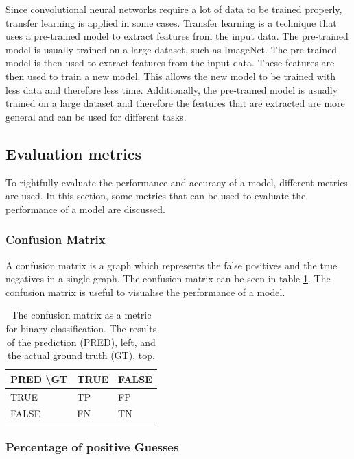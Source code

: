 Since convolutional neural networks require a lot of data to be trained properly, transfer learning is applied in some cases. Transfer learning is a technique that uses a pre-trained model to extract features from the input data. The pre-trained model is usually trained on a large dataset, such as ImageNet\cite{ImageNet}. The pre-trained model is then used to extract features from the input data. These features are then used to train a new model. This allows the new model to be trained with less data and therefore less time. Additionally, the pre-trained model is usually trained on a large dataset and therefore the features that are extracted are more general and can be used for different tasks. 

\subsection{Evaluation metrics}

To rightfully evaluate the performance and accuracy of a model, different metrics are used. In this section, some metrics that can be used to evaluate the performance of a model are discussed.

\subsubsection{Confusion Matrix}

A confusion matrix is a graph which represents the false positives and the true negatives in a single graph. The confusion matrix can be seen in table \ref{tab:confusion_matrix}. The confusion matrix is useful to visualise the performance of a model.

\begin{table}[ht]
    \caption[The Confusion Matrix]{The confusion matrix as a metric for binary classification. The results of the prediction (PRED), left, and the actual ground truth (GT), top.}
    \label{tab:confusion_matrix}
    \centering
    \begin{tabular}{l|ll}
    PRED \textbackslash GT & TRUE & FALSE \\ \hline
    TRUE                   & TP   & FP    \\
    FALSE                  & FN   & TN   
    \end{tabular}
\end{table}

\subsubsection{Percentage of positive Guesses}

